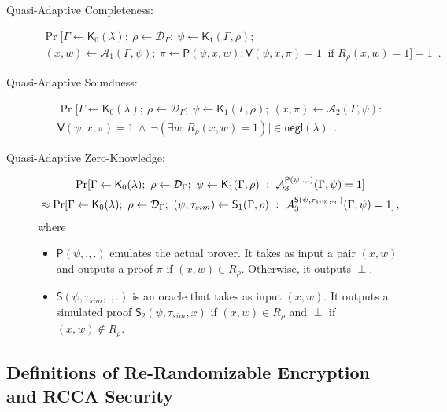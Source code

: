 \documentclass[10pt]{llncs}
\newcommand{\A}{\mathcal{A}}
\newcommand{\D}{\mathcal{D}}
\newcommand{\PP}{\mathsf{P}}
\newcommand{\VV}{\mathsf{V}}
\newcommand{\K}{\mathsf{K}}
\newcommand{\SIM}{\mathsf{S}}
\begin{document}
\begin{description}  
\item[Quasi-Adaptive Completeness:]   
  \begin{multline*}   
    \Pr[\Gamma \leftarrow \K_0(\lambda); ~\rho \leftarrow
    \D_{\Gamma};~\psi \leftarrow \K_1(\Gamma,\rho);\\ ~(x,w)
    \leftarrow \A_1(\Gamma,\psi);~\pi \leftarrow
    \PP(\psi,x,w): \VV(\psi,x,\pi)=1 ~\textrm{ if }
    R_{\rho}(x,w)=1]=1\enspace.   
  \end{multline*}   
\item[Quasi-Adaptive Soundness:]   
  \begin{multline*}   
    \Pr[\Gamma \leftarrow \K_0(\lambda); ~\rho \leftarrow
    \D_{\Gamma};~\psi \leftarrow \K_1(\Gamma,\rho); ~(x,\pi)
    \leftarrow \A_2(\Gamma,\psi):\\ \VV(\psi,x,\pi)=1
    ~\wedge~ \neg (\exists w : R_{\rho}(x,w)=1)] \in
    \mathsf{negl}(\lambda)\enspace.   
  \end{multline*}   
\item[Quasi-Adaptive Zero-Knowledge:]     
  \begin{multline*}   
    \Pr[\Gamma \leftarrow \K_0(\lambda); ~\rho \leftarrow
    \D_{\Gamma};~\psi \leftarrow \K_1(\Gamma,\rho)~:~
    \A_3^{\PP(\psi,.,.)}(\Gamma,\psi) =1] \\ \approx \Pr[\Gamma
    \leftarrow \K_0(\lambda); ~\rho \leftarrow
    \D_{\Gamma};~(\psi,\tau_{sim}) \leftarrow \SIM_1(\Gamma,\rho)~:~
    \A_3^{\SIM(\psi,\tau_{sim},.,.)}(\Gamma,\psi) =1]\thinspace,
  \end{multline*}  
  where  
  \begin{itemize}  
  \item $\PP(\psi,.,.)$ %
    emulates the actual prover. It takes as input a pair $(x,w) $ 
    and outputs a proof $\pi$ if $(x,w) \in R_{\rho}$. Otherwise, it
    outputs $\perp$.
  \item $\SIM(\psi,\tau_{sim},.,.)$ is an oracle that takes as input
    $(x,w)$. It outputs a simulated proof
    $\SIM_2(\psi,\tau_{sim},x)$ if $(x,w) \in R_{\rho}$ and
    $\perp$ if $(x,w) \not\in R_{\rho}$.
  \end{itemize}  
\end{description}   


\subsection{Definitions of Re-Randomizable Encryption and RCCA Security } \label{RCCA-def}
\end{document}
